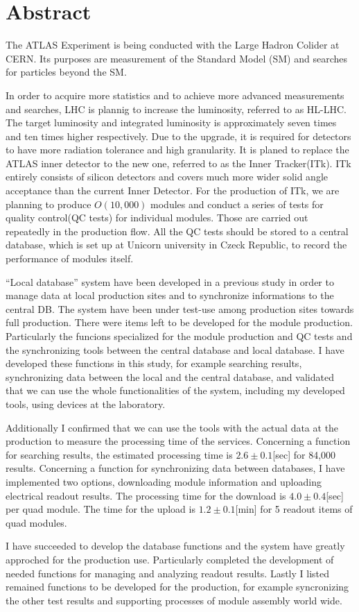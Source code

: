 \chapter*{Abstract}

The ATLAS Experiment is being conducted with the Large Hadron Colider at CERN. Its purposes are measurement of the Standard Model (SM) and searches for particles beyond the SM.

In order to acquire more statistics and to achieve more advanced measurements and searches, LHC is plannig to increase the luminosity, referred to as HL-LHC.
The target luminosity and integrated luminosity is approximately seven times and ten times higher respectively.
Due to the upgrade, it is required for detectors to have more radiation tolerance and high granularity. 
It is planed to replace the ATLAS inner detector to the new one, referred to as the Inner Tracker(ITk). 
ITk entirely consists of silicon detectors and covers much more wider solid angle acceptance than the current Inner Detector.
For the production of ITk, we are planning to produce $O(10,000)$ modules and conduct a series of tests for quality control(QC tests) for individual modules. 
Those are carried out repeatedly in the production flow.
All the QC tests should be stored to a central database, which is set up at Unicorn university in Czeck Republic, to record the performance of modules itself. 

``Local database'' system have been developed in a previous study in order to manage data at local production sites and to synchronize informations to the central DB. The system have been under test-use among production sites towards full production.
There were items left to be developed for the module production. 
Particularly the funcions specialized for the module production and QC tests and the synchronizing tools between the central database and local database.
I have developed these functions in this study, for example searching results, synchronizing data between the local and the central database, and validated that we can use the whole functionalities of the system, including my developed tools, using devices at the laboratory. 

Additionally I confirmed that we can use the tools with the actual data at the production to measure the processing time of the services.
Concerning a function for searching results, the estimated processing time is $2.6\pm 0.1$[sec] for 84,000 results.
Concerning a function for synchronizing data between databases, I have implemented two options, downloading module information and uploading electrical readout results.
The processing time for the download is $4.0\pm 0.4$[sec] per quad module.
The time for the upload is $1.2\pm 0.1$[min] for 5 readout items of quad modules.

I have succeeded to develop the database functions and the system have greatly approched for the production use.
Particularly completed the development of needed functions for managing and analyzing readout results. 
Lastly I listed remained functions to be developed for the production, for example syncronizing the other test results and supporting processes of module assembly world wide.
